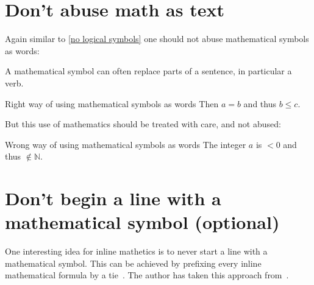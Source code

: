 \section{Don’t abuse math as text}

Again similar to \cref{no logical symbols} one should not abuse mathematical symbols as words:

A mathematical symbol can often replace parts of a sentence, in particular a verb.
\begin{showlatex}{Right way of using mathematical symbols as words}
Then $a = b$ and thus $b \leq c$.
\end{showlatex}
But this use of mathematics should be treated with care, and not abused:
\begin{showlatex}{Wrong way of using mathematical symbols as words}
The integer $a$ is $< 0$ and thus $\notin \mathbb{N}$.
\end{showlatex}





\section{Don’t begin a line with a mathematical symbol (optional)}

One interesting idea for inline mathetics is to never start a line with a mathematical symbol.
This can be achieved by prefixing every inline mathematical formula by a tie~\inlinecode{\customtexttilde}.
The author has taken this approach from~\cite{nomath_at_line}.





